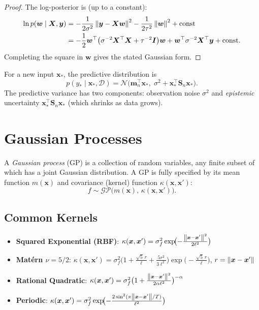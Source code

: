 \begin{proof}
The log-posterior is (up to a constant):
\begin{align}
  \ln p(\bm{w}\mid\bm{X},\bm{y})
  &= -\frac{1}{2\sigma^2}\left\| \bm{y}-\bm{X}\bm{w} \right\|^2 - \frac{1}{2\tau^2}\left\| \bm{w} \right\|^2 + \text{const} \\
  &= -\frac{1}{2}\bm{w}^\top\bigl(\sigma^{-2}\bm{X}^\top\bm{X}+\tau^{-2}\bm{I}\bigr)\bm{w}
     + \bm{w}^\top\sigma^{-2}\bm{X}^\top\bm{y} + \text{const}.
\end{align}
Completing the square in $\bm{w}$ gives the stated Gaussian form.
\end{proof}

\begin{definition}
For a new input $\bm{x}_*$, the predictive distribution is
\[
  p(y_*\mid\bm{x}_*,\mathcal{D})
  = \mathcal{N}\bigl(\bm{m}_n^\top\bm{x}_*,\;\sigma^2 + \bm{x}_*^\top\bm{S}_n\bm{x}_*\bigr).
\]
The predictive variance has two components: observation noise $\sigma^2$ and \emph{epistemic} uncertainty $\bm{x}_*^\top\bm{S}_n\bm{x}_*$ (which shrinks as data grows).
\end{definition}

\section{Gaussian Processes}

\begin{definition}
A \emph{Gaussian process} (GP) is a collection of random variables, any finite subset of which has a joint Gaussian distribution. A GP is fully specified by its mean function $m(\bm{x})$ and covariance (kernel) function $\kappa(\bm{x},\bm{x}')$:
\[
  f \sim \mathcal{GP}\bigl(m(\bm{x}),\,\kappa(\bm{x},\bm{x}')\bigr).
\]
\end{definition}

\subsection{Common Kernels}

\begin{keyformulas}[title=\textbf{GP Kernel Functions}]
\begin{itemize}
  \item \textbf{Squared Exponential (RBF)}:
    $\kappa(\bm{x},\bm{x}')=\sigma_f^2\exp\!\bigl(-\frac{\left\| \bm{x}-\bm{x}' \right\|^2}{2\ell^2}\bigr)$
  \item \textbf{Mat\'ern $\nu=5/2$}:
    $\kappa(\bm{x},\bm{x}')=\sigma_f^2\bigl(1+\frac{\sqrt{5}\,r}{\ell}+\frac{5r^2}{3\ell^2}\bigr)\exp\!\bigl(-\frac{\sqrt{5}\,r}{\ell}\bigr)$,\; $r=\left\| \bm{x}-\bm{x}' \right\|$
  \item \textbf{Rational Quadratic}:
    $\kappa(\bm{x},\bm{x}')=\sigma_f^2\bigl(1+\frac{\left\| \bm{x}-\bm{x}' \right\|^2}{2\alpha\ell^2}\bigr)^{-\alpha}$
  \item \textbf{Periodic}:
    $\kappa(\bm{x},\bm{x}')=\sigma_f^2\exp\!\bigl(-\frac{2\sin^2(\pi\left\| \bm{x}-\bm{x}' \right\|/T)}{\ell^2}\bigr)$
\end{itemize}
\end{keyformulas}

